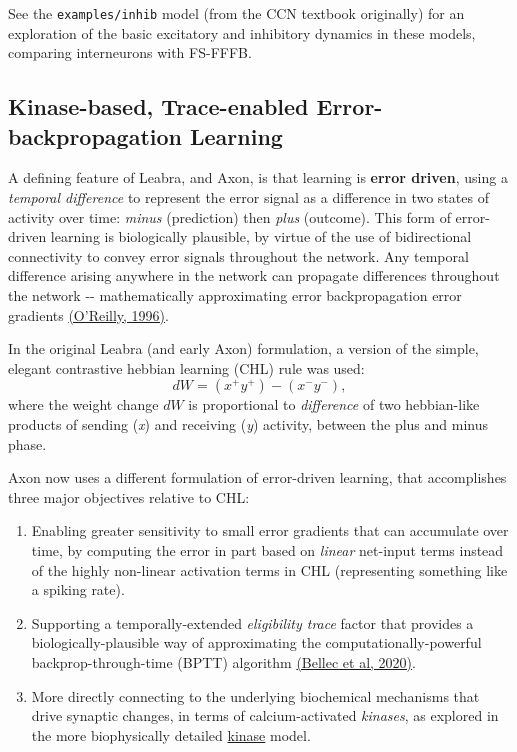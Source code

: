 \documentclass[11pt,twoside]{article}
\newif\myifpdf
\begin{document}
See the \texttt{examples/inhib} model (from the CCN textbook originally) for an exploration of the basic excitatory and inhibitory dynamics in these models, comparing interneurons with FS-FFFB. 

\subsection{Kinase-based, Trace-enabled Error-backpropagation Learning}

A defining feature of Leabra, and Axon, is that learning is \textbf{error driven}, using a \emph{temporal difference} to represent the error signal as a difference in two states of activity over time: \emph{minus} (prediction) then \emph{plus} (outcome). This form of error-driven learning is biologically plausible, by virtue of the use of bidirectional connectivity to convey error signals throughout the network. Any temporal difference arising anywhere in the network can propagate differences throughout the network -\/- mathematically approximating error backpropagation error gradients \protect\hyperlink{references}{(O'Reilly, 1996)}.

In the original Leabra (and early Axon) formulation, a version of the simple, elegant contrastive hebbian learning (CHL) rule was used:
\begin{equation}
  dW = (x^+ y^+) - (x^- y^-),
\end{equation}
where the weight change $dW$ is proportional to \emph{difference} of two hebbian-like products of sending (\emph{x}) and receiving (\emph{y}) activity, between the plus and minus phase.

Axon now uses a different formulation of error-driven learning, that accomplishes three major objectives relative to CHL: 
\begin{enumerate}
\def\labelenumi{\arabic{enumi}.}
\tightlist
\item
  Enabling greater sensitivity to small error gradients that can accumulate over time, by computing the error in part based on \emph{linear} net-input terms instead of the highly non-linear activation terms in CHL (representing something like a spiking rate).

\item
  Supporting a temporally-extended \emph{eligibility trace} factor that provides a biologically-plausible way of approximating the computationally-powerful backprop-through-time (BPTT) algorithm \protect\hyperlink{references}{(Bellec et al, 2020)}. 

\item
  More directly connecting to the underlying biochemical mechanisms that drive synaptic changes, in terms of calcium-activated \emph{kinases}, as explored in the more biophysically detailed \href{https://github.com/ccnlab/kinase/tree/main/sims/kinase}{kinase} model.

\end{enumerate}
\end{document}
